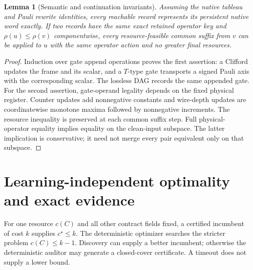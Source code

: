 \documentclass[11pt]{article}
\newtheorem{lemma}[theorem]{Lemma}
\begin{document}
\begin{lemma}[Semantic and continuation invariants]
Assuming the native tableau and Pauli rewrite identities, every reachable record represents its persistent native word exactly. If two records have the same exact retained operator key and $\rho(u)\le\rho(v)$ componentwise, every resource-feasible common suffix from $v$ can be applied to $u$ with the same operator action and no greater final resources.
\end{lemma}
\begin{proof}
Induction over gate append operations proves the first assertion: a Clifford updates the frame and its scalar, and a $T$-type gate transports a signed Pauli axis with the corresponding scalar. The lossless DAG records the same appended gate. For the second assertion, gate-operand legality depends on the fixed physical register. Counter updates add nonnegative constants and wire-depth updates are coordinatewise monotone maxima followed by nonnegative increments. The resource inequality is preserved at each common suffix step. Full physical-operator equality implies equality on the clean-input subspace. The latter implication is conservative; it need not merge every pair equivalent only on that subspace.
\end{proof}

\section{Learning-independent optimality and exact evidence}
For one resource $c(C)$ and all other contract fields fixed, a certified incumbent of cost $k$ supplies $c^\star\le k$. The deterministic optimizer searches the stricter problem $c(C)\le k-1$. Discovery can supply a better incumbent; otherwise the deterministic auditor may generate a closed-cover certificate. A timeout does not supply a lower bound.
\end{document}
